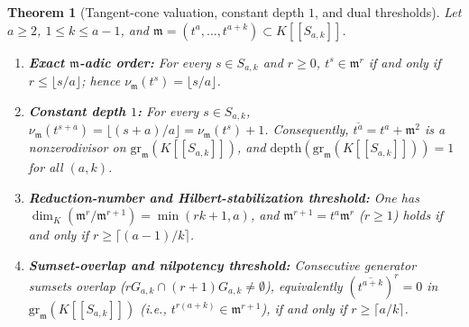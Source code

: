 \documentclass[11pt]{amsart}
\newtheorem{theorem}{Theorem}[section]
\theoremstyle{definition}
\theoremstyle{remark}
\newcommand{\mm}{\mathfrak{m}}
\newcommand{\gr}{\mathrm{gr}}
\newcommand{\depth}{\mathrm{depth}}
\begin{document}
\begin{theorem}[Tangent-cone valuation, constant depth $1$, and dual thresholds]
\label{thm:tangent}
Let $a \ge 2$, $1 \le k \le a-1$, and $\mm = (t^a, \dots, t^{a+k}) \subset K[[S_{a,k}]]$.
\begin{enumerate}
  \item[(i)] \textbf{Exact $\mm$-adic order:} For every $s \in S_{a,k}$ and $r \ge 0$, $t^s \in \mm^r$ if and only if $r \le \lfloor s/a \rfloor$; hence $\nu_{\mm}(t^s) = \lfloor s/a \rfloor$.
  \item[(ii)] \textbf{Constant depth $1$:} For every $s \in S_{a,k}$, $\nu_{\mm}(t^{s+a}) = \lfloor (s+a)/a \rfloor = \nu_{\mm}(t^s) + 1$. Consequently, $\overline{t^a} = t^a + \mm^2$ is a nonzerodivisor on $\gr_{\mm}(K[[S_{a,k}]])$, and $\depth(\gr_{\mm}(K[[S_{a,k}]])) = 1$ for all $(a,k)$.
  \item[(iii)] \textbf{Reduction-number and Hilbert-stabilization threshold:} One has $\dim_K(\mm^r / \mm^{r+1}) = \min(rk + 1, a)$, and $\mm^{r+1} = t^a \mm^r$ ($r \ge 1$) holds if and only if $r \ge \lceil (a-1)/k \rceil$.
  \item[(iv)] \textbf{Sumset-overlap and nilpotency threshold:} Consecutive generator sumsets overlap ($r G_{a,k} \cap (r+1) G_{a,k} \ne \emptyset$), equivalently $(\overline{t^{a+k}})^r = 0$ in $\gr_{\mm}(K[[S_{a,k}]])$ (i.e., $t^{r(a+k)} \in \mm^{r+1}$), if and only if $r \ge \lceil a/k \rceil$.
\end{enumerate}
\end{theorem}
\end{document}
